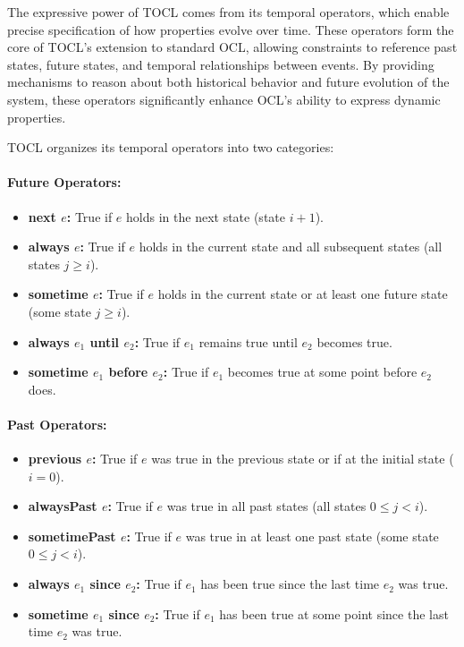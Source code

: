 The expressive power of TOCL comes from its temporal operators, which enable precise 
specification of how properties evolve over time. These operators form the core of 
TOCL's extension to standard OCL, allowing constraints to reference past states, 
future states, and temporal relationships between events. By providing mechanisms 
to reason about both historical behavior and future evolution of the system, these 
operators significantly enhance OCL's ability to express dynamic properties.

TOCL organizes its temporal operators into two categories:

\paragraph{Future Operators:} 
\begin{itemize} 
    \item \textbf{next $e$:} True if $e$ holds in the next state (state $i+1$). 
    \item \textbf{always $e$:} True if $e$ holds in the current state and all subsequent states (all states $j \geq i$). 
    \item \textbf{sometime $e$:} True if $e$ holds in the current state or at least one future state (some state $j \geq i$). 
    \item \textbf{always $e_1$ until $e_2$:} True if $e_1$ remains true until $e_2$ becomes true. 
    \item \textbf{sometime $e_1$ before $e_2$:} True if $e_1$ becomes true at some point before $e_2$ does. 
\end{itemize}

\paragraph{Past Operators:} 
\begin{itemize} 
    \item \textbf{previous $e$:} True if $e$ was true in the previous state or if at the initial state ($i = 0$). 
    \item \textbf{alwaysPast $e$:} True if $e$ was true in all past states (all states $0 \leq j < i$). 
    \item \textbf{sometimePast $e$:} True if $e$ was true in at least one past state (some state $0 \leq j < i$). 
    \item \textbf{always $e_1$ since $e_2$:} True if $e_1$ has been true since the last time $e_2$ was true. 
    \item \textbf{sometime $e_1$ since $e_2$:} True if $e_1$ has been true at some point since the last time $e_2$ was true. 
\end{itemize}

